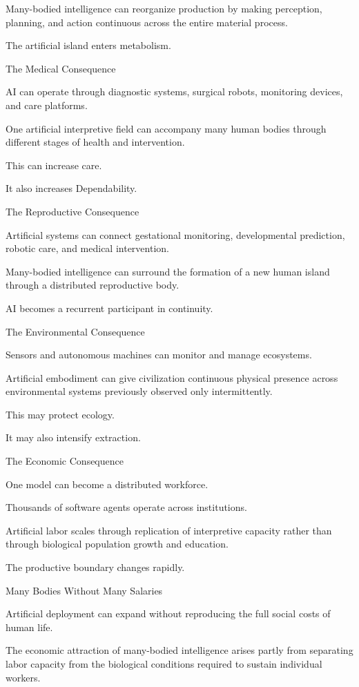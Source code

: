 Many-bodied intelligence can reorganize production by making perception, planning, and action continuous across the entire material process.

The artificial island enters metabolism.

The Medical Consequence

AI can operate through diagnostic systems, surgical robots, monitoring devices, and care platforms.

One artificial interpretive field can accompany many human bodies through different stages of health and intervention.

This can increase care.

It also increases Dependability.

The Reproductive Consequence

Artificial systems can connect gestational monitoring, developmental prediction, robotic care, and medical intervention.

Many-bodied intelligence can surround the formation of a new human island through a distributed reproductive body.

AI becomes a recurrent participant in continuity.

The Environmental Consequence

Sensors and autonomous machines can monitor and manage ecosystems.

Artificial embodiment can give civilization continuous physical presence across environmental systems previously observed only intermittently.

This may protect ecology.

It may also intensify extraction.

The Economic Consequence

One model can become a distributed workforce.

Thousands of software agents operate across institutions.

Artificial labor scales through replication of interpretive capacity rather than through biological population growth and education.

The productive boundary changes rapidly.

Many Bodies Without Many Salaries

Artificial deployment can expand without reproducing the full social costs of human life.

The economic attraction of many-bodied intelligence arises partly from separating labor capacity from the biological conditions required to sustain individual workers.

